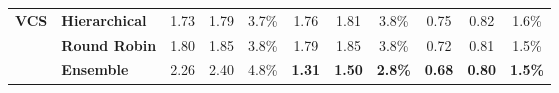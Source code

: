 \begin{table}[!h]
\begin{tabular}{llccc|ccc|ccc}
\multirow{3}{*}{\textbf{VCS}}
& \textbf{Hierarchical} & 1.73 & 1.79 & 3.7\% & 1.76 & 1.81 & 3.8\% & 0.75 & 0.82 & 1.6\% \\
& \textbf{Round Robin} & 1.80 & 1.85 & 3.8\% & 1.79 & 1.85 & 3.8\% & 0.72 & 0.81 & 1.5\% \\
& \textbf{Ensemble} & 2.26 & 2.40 & 4.8\% & \textbf{1.31} & \textbf{1.50} & \textbf{2.8\%} & \textbf{0.68} & \textbf{0.80} & \textbf{1.5\%} \\

\bottomrule
\end{tabular}
\end{table}